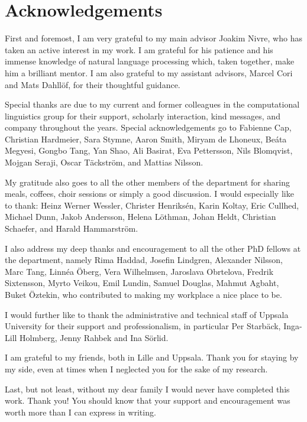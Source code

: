 %
\chapter*{Acknowledgements}%
First and foremost, I am very grateful to my main advisor Joakim Nivre, who has taken an active interest in my work. I am grateful for his patience and his immense knowledge of natural language processing which, taken together, make him a brilliant mentor. 
 I am also grateful to my assistant advisors, Marcel Cori and Mats Dahllöf, for their thoughtful guidance.
 
Special thanks are due to my current and former colleagues in the computational linguistics group for their support, scholarly interaction, kind messages, and company throughout the years. Special acknowledgements go to Fabienne Cap, Christian Hardmeier, Sara Stymne, Aaron Smith, Miryam de Lhoneux, Beáta Megyesi, Gongbo Tang, Yan Shao, Ali Basirat, Eva Pettersson, Nils Blomqvist, Mojgan Seraji, Oscar Täckström, and Mattias Nilsson. 

My gratitude also goes to all the other members of the department for sharing meals, coffees, choir sessions or simply a good discussion. I would especially like to thank: Heinz Werner Wessler, Christer Henriksén, Karin Koltay, Eric Cullhed, Michael Dunn, Jakob Andersson, Helena Löthman, Johan Heldt, Christian Schaefer, and Harald Hammarström.  

I also address my deep thanks and encouragement to all the other PhD fellows at the department, namely Rima Haddad, Josefin Lindgren, Alexander Nilsson, Marc Tang,  Linnéa Öberg, Vera Wilhelmsen, Jaroslava Obrtelova, Fredrik Sixtensson, Myrto Veikou, Emil Lundin, Samuel Douglas, Mahmut Agbaht, Buket Öztekin, who contributed to making my workplace a nice place to be.

I would further like to thank the administrative and technical staff of Uppsala University for their support and professionalism, in particular Per Starbäck, Inga-Lill Holmberg, Jenny Rahbek and Ina Sörlid.


I am grateful to my friends, both in Lille and Uppsala. Thank you for staying by my side, even at times when I neglected you for the sake of my research.  

Last, but not least, without my dear family I would never have completed this work. Thank you! You should know that your support and encouragement was worth more than I can express in writing.
